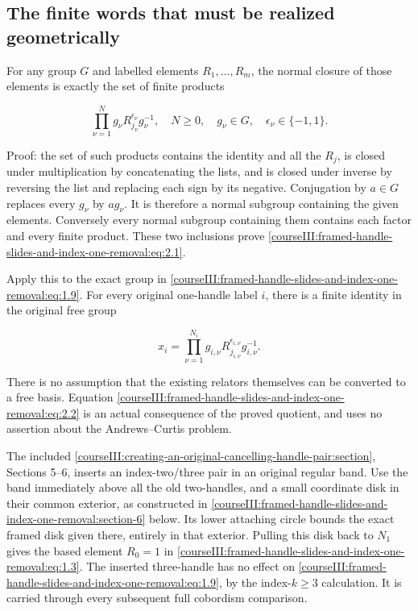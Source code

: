 \subsection{The finite words that must be realized geometrically}
\label{courseIII:framed-handle-slides-and-index-one-removal:slide-normal-closure}

\label{courseIII:framed-handle-slides-and-index-one-removal:section-2}\label{courseIII:low-index-slides:2}

For any group \(G\) and labelled elements \(R_1,\ldots,R_m\), the normal closure of those elements is exactly the set of finite products

\begin{equation}
\prod_{\nu=1}^{N}g_\nu R_{j_\nu}^{\epsilon_\nu}g_\nu^{-1},
 \quad
 N\geq0,\quad g_\nu\in G,\quad
 \epsilon_\nu\in\{-1,1\}.
 \label{courseIII:framed-handle-slides-and-index-one-removal:eq:2.1}
\end{equation}

Proof: the set of such products contains the identity and all the \(R_j\), is closed under multiplication by concatenating the lists, and is closed under inverse by reversing the list and replacing each sign by its negative. Conjugation by \(a\in G\) replaces every \(g_\nu\) by \(ag_\nu\). It is therefore a normal subgroup containing the given elements. Conversely every normal subgroup containing them contains each factor and every finite product. These two inclusions prove \eqref{courseIII:framed-handle-slides-and-index-one-removal:eq:2.1}.

Apply this to the exact group in \eqref{courseIII:framed-handle-slides-and-index-one-removal:eq:1.9}. For every original one-handle label \(i\), there is a finite identity in the original free group

\begin{equation}
x_i=\prod_{\nu=1}^{N_i}
        g_{i,\nu}R_{j_{i,\nu}}^{\epsilon_{i,\nu}}g_{i,\nu}^{-1}.
 \label{courseIII:framed-handle-slides-and-index-one-removal:eq:2.2}
\end{equation}

There is no assumption that the existing relators themselves can be converted to a free basis. Equation \eqref{courseIII:framed-handle-slides-and-index-one-removal:eq:2.2} is an actual consequence of the proved quotient, and uses no assertion about the Andrews--Curtis problem.

The included \cref{courseIII:creating-an-original-cancelling-handle-pair:section}, Sections 5--6, inserts an index-two/three pair in an original regular band. Use the band immediately above all the old two-handles, and a small coordinate disk in their common exterior, as constructed in \cref{courseIII:framed-handle-slides-and-index-one-removal:section-6} below. Its lower attaching circle bounds the exact framed disk given there, entirely in that exterior. Pulling this disk back to \(N_1\) gives the based element \(R_0=1\) in \eqref{courseIII:framed-handle-slides-and-index-one-removal:eq:1.3}. The inserted three-handle has no effect on \eqref{courseIII:framed-handle-slides-and-index-one-removal:eq:1.9}, by the index-\(k\geq3\) calculation. It is carried through every subsequent full cobordism comparison.

